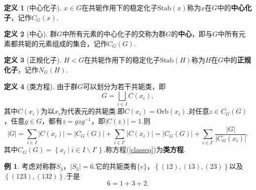 \documentclass[12pt]{ctexart}
\theoremstyle{definition}
\newtheorem{definition}{定义}
\newtheorem{example}{例}
\theoremstyle{plain}
\newcommand{\Orb}{\mathrm{Orb}}
\newcommand{\Stab}{\mathrm{Stab}}
\begin{document}
	\begin{definition}[中心化子]
		$x\in G$在共轭作用下的稳定化子$\Stab(x)$称为$x$在$G$中的\textbf{中心化子}，记作$C_G(x)$.
	\end{definition}
	\begin{definition}[中心]
		群$G$中所有元素的中心化子的交称为群$G$的\textbf{中心}，即与$G$中所有元素都共轭的元素组成的集合，记作$C_G(G)$.
	\end{definition}
	\begin{definition}[正规化子]
		$H<G$在共轭作用下的稳定化子$\Stab(H)$称为$H$在$G$中的\textbf{正规化子}，记作$N_G(H)$.
	\end{definition}
	\begin{definition}[类方程]
		由于群$G$可以划分为若干共轭类，即
		$$G=\bigsqcup_{i\in I}C(x_i),$$
		其中$C(x_i)$为以$x_i$为代表元的共轭类.即$C(x_i)=\Orb(x_i)$.对任意$z\in C_G(G)$，任意$g\in G$，都有$z=gzg^{-1}$，即$|C(z)|=1$.则
		\begin{equation}\label{classeq}
			|G|=\sum_{i\in I}|C(x_i)|=|C_G(G)|+\sum_{i\in I'}|C(x_i)|=|C_G(G)|+\sum_{i\in I'}\frac{|G|}{|C_G(x_i)|}.
		\end{equation}
		其中$C_G(G)=\left\{x_i\mid i\in I\backslash I'\right\}$.称方程(\ref{classeq})为\textbf{类方程}.
	\end{definition}
	\begin{example}
		考虑对称群$S_3$，$|S_3|=6$.它的共轭类有$\{e\}$，$\left\{(12),(13),(23)\right\}$以及$\left\{(123),(132)\right\}$.于是
		$$6=1+3+2.$$
	\end{example}
\end{document}
